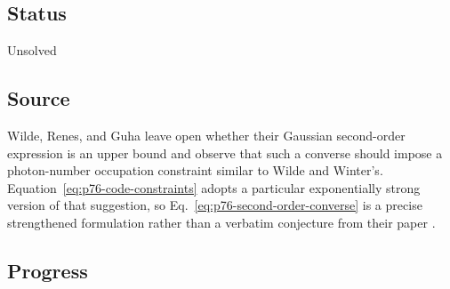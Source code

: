 \subsection*{Status}

Unsolved

\subsection*{Source}

Wilde, Renes, and Guha leave open whether their Gaussian second-order
expression is an upper bound and observe that such a converse should impose a
photon-number occupation constraint similar to Wilde and Winter's.
Equation~\eqref{eq:p76-code-constraints} adopts a particular exponentially
strong version of that suggestion, so Eq.~\eqref{eq:p76-second-order-converse}
is a precise strengthened formulation rather than a verbatim conjecture from
their paper
.

\subsection*{Progress}

